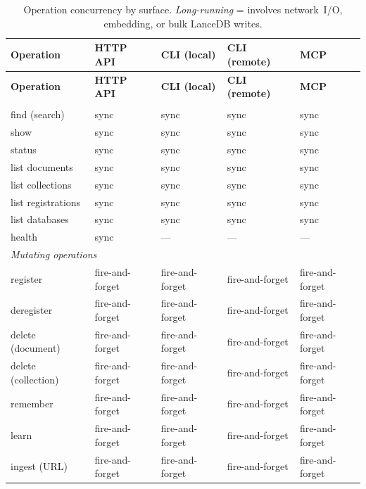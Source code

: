 \documentclass[a4paper,10pt]{article}
\begin{document}
\begin{longtable}{l l l l l}
\caption{Operation concurrency by surface.
  \emph{Long-running} = involves network~I/O, embedding, or bulk
  LanceDB writes.}\label{tab:concurrency} \\
\toprule
\textbf{Operation} & \textbf{HTTP API} & \textbf{CLI (local)}
  & \textbf{CLI (remote)} & \textbf{MCP} \\
\midrule
\endfirsthead
\toprule
\textbf{Operation} & \textbf{HTTP API} & \textbf{CLI (local)}
  & \textbf{CLI (remote)} & \textbf{MCP} \\
\midrule
\endhead
\bottomrule
\endfoot
%
\multicolumn{5}{l}{\emph{Read operations}} \\
\midrule
find (search)       & sync   & sync & sync & sync \\
show                & sync   & sync & sync & sync \\
status              & sync   & sync & sync & sync \\
list documents      & sync   & sync & sync & sync \\
list collections    & sync   & sync & sync & sync \\
list registrations  & sync   & sync & sync & sync \\
list databases      & sync   & sync & sync & sync \\
health              & sync   & ---  & ---  & ---  \\
\midrule
%
\multicolumn{5}{l}{\emph{Mutating operations}} \\
\midrule
register            & fire-and-forget & fire-and-forget & fire-and-forget & fire-and-forget \\
deregister          & fire-and-forget & fire-and-forget & fire-and-forget & fire-and-forget \\
delete (document)   & fire-and-forget & fire-and-forget & fire-and-forget & fire-and-forget \\
delete (collection) & fire-and-forget & fire-and-forget & fire-and-forget & fire-and-forget \\
remember            & fire-and-forget & fire-and-forget & fire-and-forget & fire-and-forget \\
learn               & fire-and-forget & fire-and-forget & fire-and-forget & fire-and-forget \\
ingest (URL)        & fire-and-forget & fire-and-forget & fire-and-forget
                    & fire-and-forget \\

\end{longtable}
\end{document}
